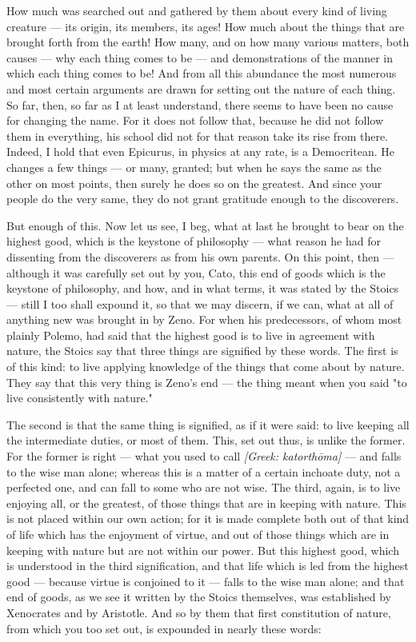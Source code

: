  How much was searched out and gathered by them about every kind of living creature — its origin, its members, its ages! How much about the things that are brought forth from the earth! How many, and on how many various matters, both causes — why each thing comes to be — and demonstrations of the manner in which each thing comes to be! And from all this abundance the most numerous and most certain arguments are drawn for setting out the nature of each thing. So far, then, so far as I at least understand, there seems to have been no cause for changing the name. For it does not follow that, because he did not follow them in everything, his school did not for that reason take its rise from there. Indeed, I hold that even Epicurus, in physics at any rate, is a Democritean. He changes a few things — or many, granted; but when he says the same as the other on most points, then surely he does so on the greatest. And since your people do the very same, they do not grant gratitude enough to the discoverers.

 But enough of this. Now let us see, I beg, what at last he brought to bear on the highest good, which is the keystone of philosophy — what reason he had for dissenting from the discoverers as from his own parents. On this point, then — although it was carefully set out by you, Cato, this end of goods which is the keystone of philosophy, and how, and in what terms, it was stated by the Stoics — still I too shall expound it, so that we may discern, if we can, what at all of anything new was brought in by Zeno. For when his predecessors, of whom most plainly Polemo, had said that the highest good is to live in agreement with nature, the Stoics say that three things are signified by these words. The first is of this kind: to live applying knowledge of the things that come about by nature. They say that this very thing is Zeno's end — the thing meant when you said "to live consistently with nature."

 The second is that the same thing is signified, as if it were said: to live keeping all the intermediate duties, or most of them. This, set out thus, is unlike the former. For the former is right — what you used to call \textit{[Greek: katorthōma]} — and falls to the wise man alone; whereas this is a matter of a certain inchoate duty, not a perfected one, and can fall to some who are not wise. The third, again, is to live enjoying all, or the greatest, of those things that are in keeping with nature. This is not placed within our own action; for it is made complete both out of that kind of life which has the enjoyment of virtue, and out of those things which are in keeping with nature but are not within our power. But this highest good, which is understood in the third signification, and that life which is led from the highest good — because virtue is conjoined to it — falls to the wise man alone; and that end of goods, as we see it written by the Stoics themselves, was established by Xenocrates and by Aristotle. And so by them that first constitution of nature, from which you too set out, is expounded in nearly these words:

